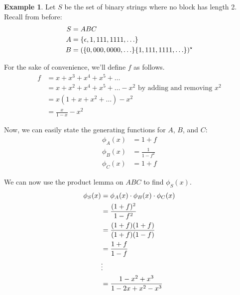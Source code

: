 \documentclass[]{article}
\theoremstyle{definition}
\newtheorem{ex}{Example}[section]
\DeclarePairedDelimiter{\set}{\lbrace}{\rbrace}
\begin{document}
			\begin{ex}
				Let $S$ be the set of binary strings where no block has length 2. Recall from before:
				\begin{align*}
					S &= ABC \\
					A &= \set{\epsilon, 1, 111, 1111, \ldots} \\
					B &= (\set{0, 000, 0000, \ldots}\set{1, 111, 1111, \ldots})^\star
				\end{align*}

				For the sake of convenience, we'll define $f$ as follows.
				\begin{align*}
					f &= x + x^3 + x^4 + x^5 + \ldots \\
					&= x + x^2 + x^4 + x^5 + \ldots - x^2 \text{ by adding and removing } x^2 \\
					&= x(1 + x + x^2 + \ldots) - x^2 \\
					&= \frac{x}{1 - x} - x^2
				\end{align*}

				Now, we can easily state the generating functions for $A$, $B$, and $C$:
				\begin{align*}
					\phi_A(x) &= 1 + f \\
					\phi_B(x) &= \frac{1}{1 - f^2} \\
					\phi_C(x) &= 1 + f
				\end{align*}

				We can now use the product lemma on $ABC$ to find $\phi_S(x)$.
				\begin{align*}
					\phi_S(x) &= \phi_A(x) \cdot \phi_B(x) \cdot \phi_C(x) \\
					&= \frac{(1 + f)^2}{1 - f^2} \\
					&= \frac{(1 + f)(1 + f)}{(1 + f)(1 - f)} \\
					&= \frac{1 + f}{1 - f} \\
					& \text{\vdots} \\ 
					&= \frac{1 - x^2 + x^3}{1 - 2x + x^2 - x^3}
				\end{align*}
			\end{ex}
\end{document}
